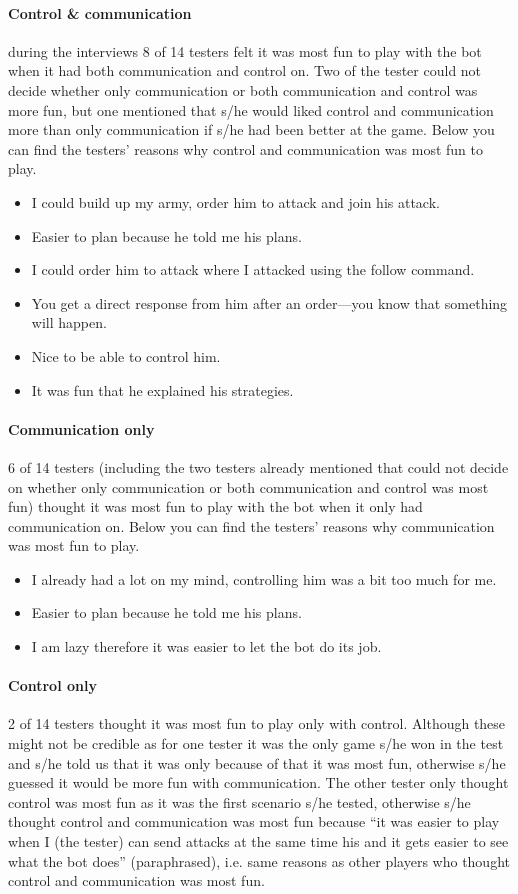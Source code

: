 \paragraph{Control \& communication}
during the interviews 8 of 14 testers felt it was most fun to play with the bot when it had both
communication and control on. Two of the tester could not decide whether only communication or both
communication and control was more fun, but one mentioned that s/he would liked control and
communication more than only communication if s/he had been better at the game. Below you can find
the testers' reasons why control and communication was most fun to play.
\begin{itemize}
	\item I could build up my army, order him to attack and join his attack.
	\item Easier to plan because he told me his plans.
	\item I could order him to attack where I attacked using the follow command.
	\item You get a direct response from him after an order—you know that something will happen.
	\item Nice to be able to control him.
	\item It was fun that he explained his strategies.
\end{itemize}

\paragraph{Communication only}
6 of 14 testers (including the two testers already mentioned that could not decide on whether only
communication or both communication and control was most fun) thought it was most fun to play with
the bot when it only had communication on. Below you can find the testers' reasons why communication
was most fun to play.
\begin{itemize}
	\item I already had a lot on my mind, controlling him was a bit too much for me.	
	\item Easier to plan because he told me his plans.
	\item I am lazy therefore it was easier to let the bot do its job.
\end{itemize}

\paragraph{Control only}
2 of 14 testers thought it was most fun to play only with control. Although these might not be
credible as for one tester it was the only game s/he won in the test and s/he told us that it was
only because of that it was most fun, otherwise s/he guessed it would be more fun with
communication. The other tester only thought control was most fun as it was the first scenario s/he
tested, otherwise s/he thought control and communication was most fun because ``it was easier to play
when I (the tester) can send attacks at the same time his and it gets easier to see what the bot
does'' (paraphrased), i.e. same reasons as other players who thought control and communication was most fun.

